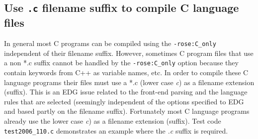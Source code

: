 \subsection{Use {\tt *.c} filename suffix to compile C language files}
In general most C programs can be compiled using the {\tt -rose:C\_only}
independent of their filename suffix. However,
sometimes C program files that use a non *.c suffix cannot be handled by the
{\tt -rose:C\_only} option because they contain keywords from C++ as variable 
names, etc.  In order to compile these C language programs their files must use 
a *.c (lower case {\em c}) as a filename extension (suffix).  This is an EDG
issue related to the front-end parsing and the language rules that are selected
(seemingly independent of the options specified to EDG and based partly on the
filename suffix).  Fortunately most C language programs already use the lower
case {\em c}) as a filename extension (suffix).  Test code {\tt test2006\_110.c}
demonstrates an example where the {\em *.c} suffix is required.















